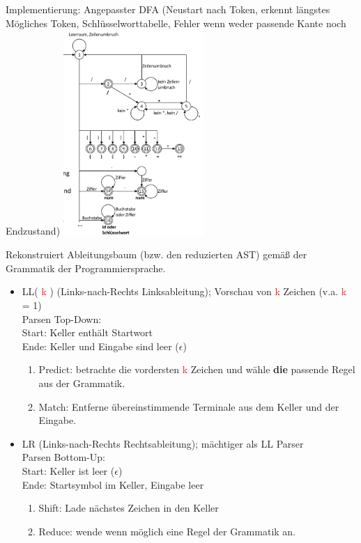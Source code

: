 Implementierung: Angepasster DFA (Neustart nach Token, erkennt längstes Mögliches Token, Schlüsselworttabelle, Fehler wenn weder passende Kante noch Endzustand)
\includegraphics[angle=90,width=0.4\textwidth]{scanner}


\newcommand{\K}{ \textcolor{red}{k} }
Rekonstruiert Ableitungsbaum (bzw. den reduzierten AST) gemäß der Grammatik der Programmiersprache.
\begin{itemize}
\item LL(\K) (Links-nach-Rechts Linksableitung); Vorschau von \K Zeichen (v.a. \K = 1)\\ 
		Parsen Top-Down: \\
		Start: Keller enthält Startwort\\
		Ende: Keller und Eingabe sind leer ($\epsilon$)
	\begin{enumerate}
		\item Predict: betrachte die vordersten \K Zeichen und wähle \textbf{die} passende Regel aus der Grammatik.
		\item Match: Entferne übereinstimmende Terminale aus dem Keller und der Eingabe.
	\end{enumerate}
	
	
\item LR (Links-nach-Rechts Rechtsableitung); mächtiger als LL Parser\\
	Parsen Bottom-Up:\\
		Start: Keller ist leer ($\epsilon$)\\
		Ende: Startsymbol im Keller, Eingabe leer
	\begin{enumerate}
		\item Shift: Lade nächstes Zeichen in den Keller
		\item Reduce: wende wenn möglich eine Regel der Grammatik an.
	\end{enumerate}
		

\end{itemize}



